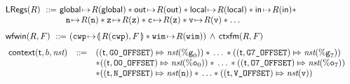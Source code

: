 \begin{figure}[!t]
\[\begin{array}{l}
            \\[-5pt]
            \LRegs{\RFile} \ \define \ \regst{\globalRN}{\RFile(\globalRN)} \sepstar 
            \regst{\outRN}{\RFile(\outRN)} \sepstar \regst{\localRN}{\RFile(\localRN)} 
            \sepstar \regst{\inRN}{\RFile(\inRN)} \sepstar \\
            \hspace*{7em} \regst{\regn}{\RFile(\regn)} \sepstar 
            \regst{\regz}{\RFile(\regz)} \sepstar \regst{\regc}{\RFile(\regz)} 
            \sepstar \regst{\regv}{\RFile(\regv)} \sepstar \dots
            \\
            \\[-5pt]
            \wfwin{\RFile}{\Wstack} \ \define \ 
            (\stackAstP{\RFile(\regcwp)}{\Wstack} \sepstar 
                \regst{\regwim}{\RFile(\regwim)}) 
            \, \land \, \ctxfm(\RFile, \Wstack)
            \\
            \\[-5pt]
            \hspace*{-0.15em}
            \begin{array}{lll}
                \relcontext{\thrdid}{\block}{\nst} & \define & 
                (\relmsto{(\thrdid, \ofsGOne)}{\nst(\greg{0})}) 
                \sepstar \, \dots \, \sepstar
                (\relmsto{(\thrdid, \ofsGEig)}{\nst(\greg{7})}) \\
                & & 
                \sepstar
                (\relmsto{(\thrdid, \ofsOOne)}{\nst(\oreg{0})}) 
                \sepstar \, \dots \, \sepstar
                (\relmsto{(\thrdid, \ofsOEig)}{\nst(\oreg{7})}) \\
                & & 
                \sepstar 
                (\relmsto{(\thrdid, \ofsN)}{\nst(\regn)}) \sepstar \, \dots 
                \sepstar (\relmsto{(\thrdid, \ofsV)}{\nst(\regv)}) \\
                & & 

\end{array}
\end{array}\]
\end{figure}
